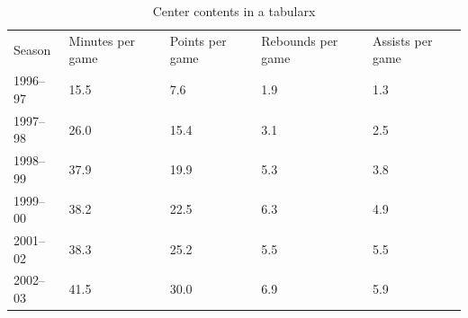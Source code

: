 	\begin{table}
	\centering
		\begin{tabularx}{0.9\textwidth}{| Y | Y | Y | Y | Y |}
			\hline
			Season  & Minutes per game  & Points per game  & Rebounds per game & Assists per game \\
			1996–97 & 15.5 & 7.6  & 1.9 & 1.3 \\
			1997–98	& 26.0 & 15.4 &	3.1	& 2.5 \\
			1998–99	& 37.9 & 19.9 &	5.3 & 3.8 \\
			1999–00	& 38.2 & 22.5 &	6.3	& 4.9 \\
			2001–02 & 38.3 & 25.2 &	5.5	& 5.5 \\
			2002–03 & 41.5 & 30.0 & 6.9 & 5.9 \\
			\hline
		\end{tabularx}
		\caption{Center contents in a tabularx}
		\label{table_8}
	\end{table}
